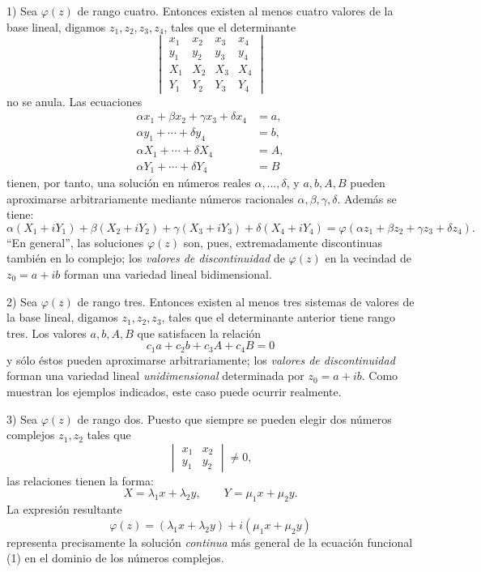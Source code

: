\documentclass[11pt]{article}
\begin{document}
1) Sea $\varphi(z)$ de rango cuatro. Entonces existen al menos cuatro valores de la base lineal, digamos $z_1,z_2,z_3,z_4$, tales que el determinante
\[
\begin{vmatrix}
x_1&x_2&x_3&x_4\\
y_1&y_2&y_3&y_4\\
X_1&X_2&X_3&X_4\\
Y_1&Y_2&Y_3&Y_4
\end{vmatrix}
\]
no se anula. Las ecuaciones
\[
\begin{aligned}
\alpha x_1+\beta x_2+\gamma x_3+\delta x_4&=a,\\
\alpha y_1+\cdots+\delta y_4&=b,\\
\alpha X_1+\cdots+\delta X_4&=A,\\
\alpha Y_1+\cdots+\delta Y_4&=B
\end{aligned}
\]
tienen, por tanto, una solución en números reales $\alpha,\ldots,\delta$, y $a,b,A,B$ pueden aproximarse arbitrariamente mediante números racionales $\alpha,\beta,\gamma,\delta$. Además se tiene:
\[
\alpha(X_1+iY_1)+\beta(X_2+iY_2)+\gamma(X_3+iY_3)+\delta(X_4+iY_4)
=\varphi(\alpha z_1+\beta z_2+\gamma z_3+\delta z_4).
\]
``En general'', las soluciones $\varphi(z)$ son, pues, extremadamente discontinuas también en lo complejo; los \emph{valores de discontinuidad} de $\varphi(z)$ en la vecindad de $z_0=a+ib$ forman una variedad lineal bidimensional.

2) Sea $\varphi(z)$ de rango tres. Entonces existen al menos tres sistemas de valores de la base lineal, digamos $z_1,z_2,z_3$, tales que el determinante anterior tiene rango tres. Los valores $a,b,A,B$ que satisfacen la relación
\[
c_1a+c_2b+c_3A+c_4B=0
\]
y sólo éstos pueden aproximarse arbitrariamente; los \emph{valores de discontinuidad} forman una variedad lineal \emph{unidimensional} determinada por $z_0=a+ib$. Como muestran los ejemplos indicados, este caso puede ocurrir realmente.

3) Sea $\varphi(z)$ de rango dos. Puesto que siempre se pueden elegir dos números complejos $z_1,z_2$ tales que
\[
\begin{vmatrix}x_1&x_2\\ y_1&y_2\end{vmatrix}\ne0,
\]
las relaciones tienen la forma:
\[
X=\lambda_1x+\lambda_2y,\qquad Y=\mu_1x+\mu_2y.
\]
La expresión resultante
\[
\varphi(z)=(\lambda_1x+\lambda_2y)+i(\mu_1x+\mu_2y)
\]
representa precisamente la solución \emph{continua} más general de la ecuación funcional (1) en el dominio de los números complejos.
\end{document}

